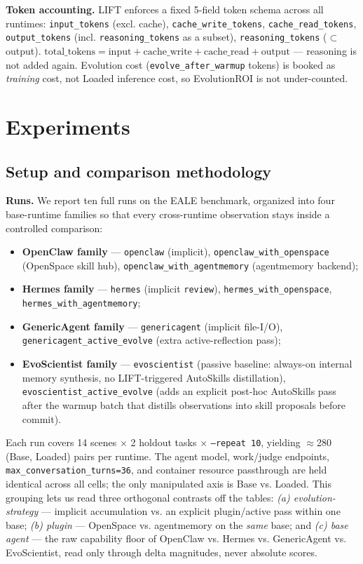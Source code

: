 \documentclass{article}
\begin{document}
\textbf{Token accounting.} LIFT enforces a fixed 5-field token schema across all runtimes: \texttt{input\_tokens} (excl. cache), \texttt{cache\_write\_tokens}, \texttt{cache\_read\_tokens}, \texttt{output\_tokens} (incl. \texttt{reasoning\_tokens} as a subset), \texttt{reasoning\_tokens} ($\subset$ output). $\text{total\_tokens} = \text{input} + \text{cache\_write} + \text{cache\_read} + \text{output}$ --- reasoning is not added again. Evolution cost (\texttt{evolve\_after\_warmup} tokens) is booked as \emph{training} cost, not Loaded inference cost, so EvolutionROI is not under-counted.


\section{Experiments}

\subsection{Setup and comparison methodology}
\label{sec:setup}

\textbf{Runs.} We report ten full runs on the EALE benchmark, organized into four base-runtime families so that every cross-runtime observation stays inside a controlled comparison:
\begin{itemize}
\item \textbf{OpenClaw family} --- \texttt{openclaw} (implicit), \texttt{openclaw\_with\_openspace} (OpenSpace skill hub), \texttt{openclaw\_with\_agentmemory} (agentmemory backend);
\item \textbf{Hermes family} --- \texttt{hermes} (implicit \texttt{review}), \texttt{hermes\_with\_openspace}, \texttt{hermes\_with\_agentmemory};
\item \textbf{GenericAgent family} --- \texttt{genericagent} (implicit file-I/O), \texttt{genericagent\_active\_evolve} (extra active-reflection pass);
\item \textbf{EvoScientist family} --- \texttt{evoscientist} (passive baseline: always-on internal memory synthesis, no LIFT-triggered AutoSkills distillation), \texttt{evoscientist\_active\_evolve} (adds an explicit post-hoc AutoSkills pass after the warmup batch that distills observations into skill proposals before commit).
\end{itemize}
Each run covers 14 scenes $\times$ 2 holdout tasks $\times$ \texttt{--repeat 10}, yielding $\approx$280 (Base, Loaded) pairs per runtime. The agent model, work/judge endpoints, \texttt{max\_conversation\_turns=36}, and container resource passthrough are held identical across all cells; the only manipulated axis is Base vs. Loaded. This grouping lets us read three orthogonal contrasts off the tables: \emph{(a) evolution-strategy} --- implicit accumulation vs. an explicit plugin/active pass within one base; \emph{(b) plugin} --- OpenSpace vs. agentmemory on the \emph{same} base; and \emph{(c) base agent} --- the raw capability floor of OpenClaw vs. Hermes vs. GenericAgent vs. EvoScientist, read only through delta magnitudes, never absolute scores.
\end{document}
